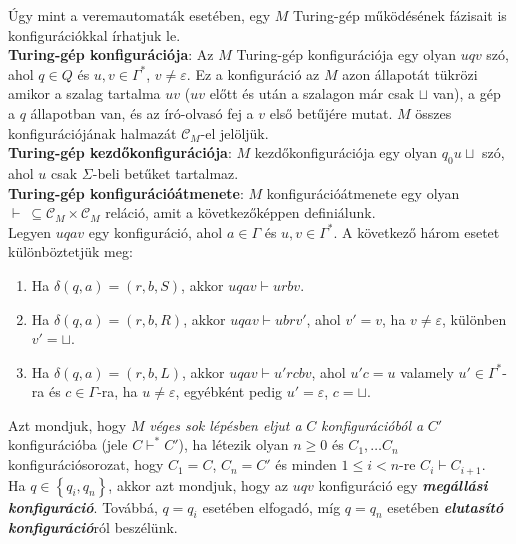\documentclass[tikz,12pt,margin=0px]{article}
\begin{document}
	\noindent Úgy mint a veremautomaták esetében, egy $M$ Turing-gép működésének fázisait	is konfigurációkkal írhatjuk le.\\
	
	\noindent \textbf{Turing-gép konfigurációja}: Az $M$ Turing-gép konfigurációja egy olyan $uqv$ szó, ahol
	$q \in Q$ és $u, v \in \Gamma^{*}$, $v \not = \varepsilon$. Ez a konfiguráció az $M$ azon állapotát tükrözi
	amikor a szalag tartalma $uv$ ($uv$ előtt és után a szalagon már csak $\sqcup$ van), a gép a $q$ állapotban van,
	és az író-olvasó fej a $v$ első betűjére mutat. $M$ összes konfigurációjának halmazát $\mathcal{C}_{M}$-el jelöljük.\\
	
	\noindent \textbf{Turing-gép kezdőkonfigurációja}: $M$ kezdőkonfigurációja egy olyan $q_{0}u\sqcup$ szó, ahol
	$u$ csak $\Sigma$-beli betűket tartalmaz.\\
	
    \noindent \textbf{Turing-gép konfigurációátmenete}: $M$ konfigurációátmenete egy olyan $\vdash\ \subseteq \mathcal{C}_{M} \times \mathcal{C}_{M}$ reláció, amit a következőképpen definiálunk.\\
	
    \noindent Legyen $uqav$ egy konfiguráció, ahol $a \in \Gamma$ és $u, v \in \Gamma^{*}$. A következő három esetet különböztetjük meg:
	
	\begin{enumerate}
		\item Ha $\delta(q,a) = (r, b, S)$, akkor $uqav \vdash urbv$.
		\item Ha $\delta(q,a) = (r, b, R)$, akkor $uqav \vdash ubrv'$, ahol $v' = v$, ha $v \not = \varepsilon$, különben	$v' = \sqcup$.
        \item Ha $\delta(q,a) = (r, b, L)$, akkor $uqav \vdash u'rcbv$, ahol $u'c = u$ valamely $u' \in \Gamma^{*}$-ra és $c \in \Gamma$-ra, ha $u \not = \varepsilon$, egyébként pedig $u' = \varepsilon$, $c = \sqcup$.
	\end{enumerate}
	
    \noindent Azt mondjuk, hogy $M$ \emph{véges sok lépésben eljut a} $C$ \emph{konfigurációból a}  $C'$ konfigurációba (jele $C \boldsymbol{\vdash^{*}} C'$), ha létezik olyan $n \geq 0$ és $C_{1}, \ldots C_{n}$ konfigurációsorozat, hogy $C_{1} = C$, $C_{n} = C'$ és minden $1 \leq i < n$-re $C_{i} \vdash C_{i+1}$.\\
	
    \noindent Ha $q \in \left\{q_{i}, q_{n}\right\}$, akkor azt mondjuk, hogy az $uqv$ konfiguráció egy \textbf{\emph{megállási konfiguráció}}. Továbbá, $q = q_{i}$ esetében elfogadó, míg $q = q_{n}$ esetében \textbf{\emph{elutasító konfiguráció}}ról beszélünk.\\
	
\end{document}
